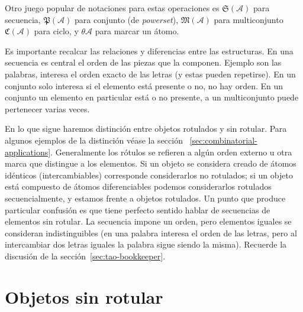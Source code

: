   Otro juego popular de notaciones para estas operaciones es
  \(\mathfrak{S}(\mathcal{A})\) para secuencia,
  \(\mathfrak{P}(\mathcal{A})\) para conjunto
  (de \emph{\foreignlanguage{english}{powerset}}),
  \(\mathfrak{M}(\mathcal{A})\) para multiconjunto
  \(\mathfrak{C}(\mathcal{A})\) para ciclo,
  y \(\theta \mathcal{A}\) para marcar un átomo.

  Es importante recalcar las relaciones y diferencias
  entre las estructuras.
  En una secuencia es central
  el orden de las piezas que la componen.
  Ejemplo son las palabras,
  interesa el orden exacto de las letras
  (y estas pueden repetirse).
  En un conjunto solo interesa si el elemento está presente o no,
  no hay orden.
  En un conjunto un elemento en particular está o no presente,
  a un multiconjunto puede pertenecer varias veces.

  En lo que sigue haremos distinción
  entre objetos rotulados y sin rotular.
  Para algunos ejemplos de la distinción véase la sección~%
    \ref{sec:combinatorial-applications}.%
  Generalmente los rótulos se refieren a algún orden externo
  u otra marca que distingue a los elementos.
  Si un objeto se considera creado de átomos idénticos
  (intercambiables)
  corresponde considerarlos no rotulados;
  si un objeto está compuesto de átomos diferenciables
  podemos considerarlos rotulados secuencialmente,
  y estamos frente a objetos rotulados.
  Un punto que produce particular confusión
  es que tiene perfecto sentido
  hablar de secuencias de elementos sin rotular.
  La secuencia impone un orden,
  pero elementos iguales se consideran indistinguibles
  (en una palabra interesa el orden de las letras,
   pero al intercambiar dos letras iguales
   la palabra sigue siendo la misma).
  Recuerde la discusión de la sección~\ref{sec:tao-bookkeeper}.

\section{Objetos sin rotular}
\label{sec:sin-rotular}

